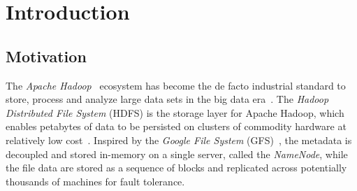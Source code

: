 
%
%
%


\chapter{Introduction}
\label{ch:Introduction}

%




\section{Motivation}

The \textit{Apache Hadoop}~\cite{apachehadoop} ecosystem has become the de facto industrial standard to store, process and analyze large data sets in the big data era~\cite{cloudera}. The \textit{Hadoop Distributed File System} (HDFS) is the storage layer for Apache Hadoop, which enables petabytes of data to be persisted on clusters of commodity hardware at relatively low cost~\cite{borthakur2008hdfs}. Inspired by the \textit{Google File System} (GFS)~\cite{ghemawat2003google}, the metadata is decoupled and stored in-memory on a single server, called the \textit{NameNode}, while the file data are stored as a sequence of blocks and replicated across potentially thousands of machines for fault tolerance.




